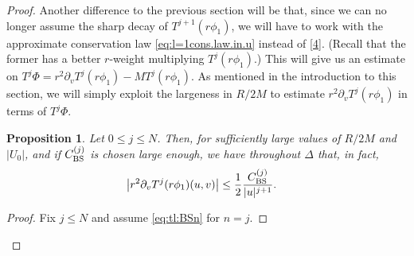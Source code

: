 \documentclass[11pt,english]{article}
\numberwithin{equation}{section}
\theoremstyle{remark}
\theoremstyle{plain}
\newtheorem{prop}{Proposition}[section]
\theoremstyle{remark}
\newcommand{\pv}{\partial_v}
\renewcommand{\(}{\left(}
\renewcommand{\)}{\right)}
\newcommand{\pho}{(r\phi_1)}
\begin{document}
\begin{proof}
Another difference to the previous section will be that, since we can no longer assume the sharp decay of $T^{j+1}\pho$, we will have to work with the approximate conservation law \eqref{eq:l=1cons.law.in.u} instead of \eqref{4}. (Recall that the former has a better $r$-weight multiplying $T^j(r\phi_1)$.) This will give us an estimate on $T^j\Phi=r^2\pv T^j\pho-MT^j\pho$. As mentioned in the introduction to this section, we will simply exploit the largeness in $R/2M$ to estimate $r^2\pv T^j\pho$ in terms of $T^j\Phi$.
\begin{prop}\label{prop:tlbs3}
Let $0\leq j\leq N$. Then, for sufficiently large values of $R/2M$ and $|U_0|$, and if $C_{\mathrm{BS}}^{(j)}$ is chosen large enough, we have throughout $\Delta$ that, in fact,
  \begin{align}
 \left |r^2\pv T^j (r\phi_1)(u,v)\right|&\leq\frac12 \frac{\cbs^{(j)}}{|u|^{j+1}}.
  \end{align}
\end{prop}
\begin{proof} Fix $j\leq N$ and assume \eqref{eq:tl:BSn} for $n=j$.
 

\end{proof}
\end{proof}
\end{document}
